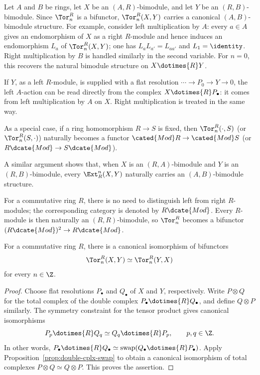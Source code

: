 \begin{remark}\label{rem:ExtTor-bimodule}
Let $A$ and $B$ be rings, let $X$ be an $(A,R)$-bimodule, and let $Y$ be an
$(R,B)$-bimodule. Since $\Tor_n^R$ is a bifunctor, $\Tor_n^R(X,Y)$ carries a
canonical $(A,B)$-bimodule structure. For example, consider left
multiplication by $A$: every $a\in A$ gives an endomorphism of $X$ as a
right $R$-module and hence induces an endomorphism $L_a$ of
$\Tor_n^R(X,Y)$; one has $L_aL_{a'}=L_{aa'}$ and $L_1=\identity$. Right
multiplication by $B$ is handled similarly in the second variable. For
$n=0$, this recovers the natural bimodule structure on $X\dotimes{R}Y$.

If $Y$, as a left $R$-module, is supplied with a flat resolution
$\cdots\to P_0\to Y\to0$, the left $A$-action can be read directly from the
complex $X\dotimes{R}P_\bullet$: it comes from left multiplication by $A$ on
$X$. Right multiplication is treated in the same way.

As a special case, if a ring homomorphism $R\to S$ is fixed, then
$\Tor_n^R(\cdot,S)$ (or $\Tor_n^R(S,\cdot)$) naturally becomes a functor
$\cated{Mod}R\to\cated{Mod}S$ (or
$R\dcate{Mod}\to S\dcate{Mod}$).

A similar argument shows that, when $X$ is an $(R,A)$-bimodule and $Y$ is an
$(R,B)$-bimodule, every $\Ext_R^n(X,Y)$ naturally carries an
$(A,B)$-bimodule structure.
\end{remark}

For a commutative ring $R$, there is no need to distinguish left from right
$R$-modules; the corresponding category is denoted by $R\dcate{Mod}$.
Every $R$-module is then naturally an $(R,R)$-bimodule, so $\Tor_n^R$ becomes
a bifunctor $(R\dcate{Mod})^2\to R\dcate{Mod}$.

\begin{proposition}\label{prop:Tor-symmetry}
For a commutative ring $R$, there is a canonical isomorphism of bifunctors
\[
\Tor_n^R(X,Y)\simeq\Tor_n^R(Y,X)
\]
for every $n\in\Z$.
\end{proposition}

\begin{proof}
Choose flat resolutions $P_\bullet$ and $Q_\bullet$ of $X$ and $Y$,
respectively. Write $P\otimes Q$ for the total complex of the double complex
$P_\bullet\dotimes{R}Q_\bullet$, and define $Q\otimes P$ similarly. The
symmetry constraint for the tensor product
\cite[Proposition 6.5.14]{Li1} gives canonical isomorphisms
\[
P_p\dotimes{R}Q_q\simeq Q_q\dotimes{R}P_p,\qquad p,q\in\Z.
\]
In other words,
$P_\bullet\dotimes{R}Q_\bullet\simeq
\mathrm{swap}(Q_\bullet\dotimes{R}P_\bullet)$. Apply
Proposition~\ref{prop:double-cplx-swap} to obtain a canonical isomorphism of
total complexes $P\otimes Q\simeq Q\otimes P$. This proves the assertion.
\end{proof}

